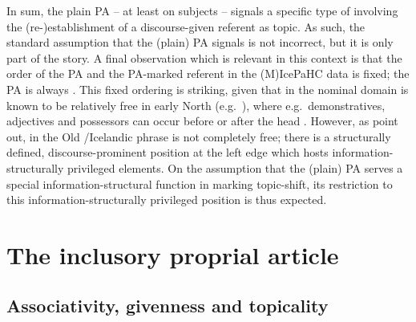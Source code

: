\documentclass[output=paper,colorlinks,citecolor=brown]{langscibook}
\begin{document}
\largerpage
In sum, the plain PA -- at least on subjects -- signals a specific type of  involving the (re-)establishment of a discourse-given referent as topic. As such, the standard assumption that the (plain) PA signals  is not incorrect, but it is only part of the story. A final observation which is relevant in this context is that the order of the PA and the PA-marked referent in the (M)IcePaHC data is fixed; the PA is always . This fixed ordering is striking, given that  in the nominal domain is known to be relatively free in early North  (e.g.~\citealp{Borjarsetal16}), where e.g.~demonstratives, adjectives and possessors can occur before or after the head . However, as \citet{Borjarsetal16} point out,  in the Old /Icelandic  phrase is not completely free; there is a structurally defined, discourse-prominent position at the left edge which
hosts information-structurally privileged elements. On the assumption that the (plain) PA serves a special information-structural function in marking topic-shift, its restriction to this information-structurally privileged position is thus expected. 


\section{The inclusory proprial article}\label{sect:gapped}

\subsection{Associativity, givenness and topicality}
\end{document}
